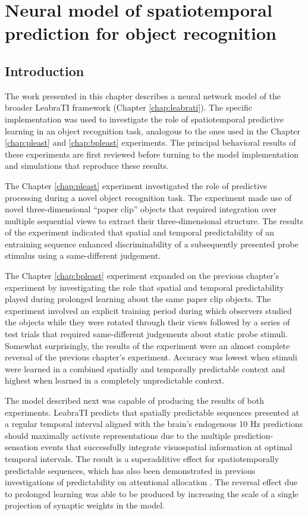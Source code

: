\documentclass[dwyatte_dissertation.tex]{subfiles}
\begin{document}
\sloppy
{}

\chapter{Neural model of spatiotemporal prediction for object recognition}

\section{Introduction}
The work presented in this chapter describes a neural network model of the broader LeabraTI framework (Chapter \ref{chap:leabrati}). The specific implementation was used to investigate the role of spatiotemporal predictive learning in an object recognition task, analogous to the ones used in the Chapter \ref{chap:pleast} and \ref{chap:bpleast} experiments. The principal behavioral results of these experiments are first reviewed before turning to the model implementation and simulations that reproduce these results.

The Chapter \ref{chap:pleast} experiment investigated the role of predictive processing during a novel object recognition task. The experiment made use of novel three-dimensional ``paper clip'' objects that required integration over multiple sequential views to extract their three-dimensional structure. The results of the experiment indicated that spatial and temporal predictability of an entraining sequence enhanced discriminability of a subsequently presented probe stimulus using a same-different judgement.

The Chapter \ref{chap:bpleast} experiment expanded on the previous chapter's experiment by investigating the role that spatial and temporal predictability played during prolonged learning about the same paper clip objects. The experiment involved an explicit training period during which observers studied the objects while they were rotated through their views followed by a series of test trials that required same-different judgements about static probe stimuli. Somewhat surprisingly, the results of the experiment were an almost complete reversal of the previous chapter's experiment. Accuracy was lowest when stimuli were learned in a combined spatially and temporally predictable context and highest when learned in a completely unpredictable context.

The model described next was capable of producing the results of both experiments. LeabraTI predicts that spatially predictable sequences presented at a regular temporal interval aligned with the brain's endogenous 10 Hz predictions should maximally activate representations due to the multiple prediction-sensation events that successfully integrate visuospatial information at optimal temporal intervals. The result is a superadditive effect for spatiotemporally predictable sequences, which has also been demonstrated in previous investigations of predictability on attentional allocation \cite{DohertyRaoMesulamEtAl05,RohenkohlGouldPessoaEtAl14}. The reversal effect due to prolonged learning was able to be produced by increasing the scale of a single projection of synaptic weights in the model. 
\end{document}
